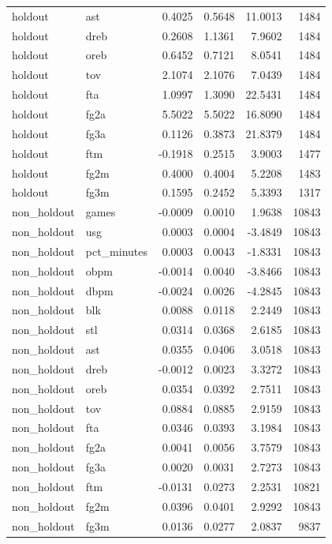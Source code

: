 \begin{table}
\begin{tabular}{llrrrr}
holdout & ast & 0.4025 & 0.5648 & 11.0013 & 1484 \\
holdout & dreb & 0.2608 & 1.1361 & 7.9602 & 1484 \\
holdout & oreb & 0.6452 & 0.7121 & 8.0541 & 1484 \\
holdout & tov & 2.1074 & 2.1076 & 7.0439 & 1484 \\
holdout & fta & 1.0997 & 1.3090 & 22.5431 & 1484 \\
holdout & fg2a & 5.5022 & 5.5022 & 16.8090 & 1484 \\
holdout & fg3a & 0.1126 & 0.3873 & 21.8379 & 1484 \\
holdout & ftm & -0.1918 & 0.2515 & 3.9003 & 1477 \\
holdout & fg2m & 0.4000 & 0.4004 & 5.2208 & 1483 \\
holdout & fg3m & 0.1595 & 0.2452 & 5.3393 & 1317 \\
non\_holdout & games & -0.0009 & 0.0010 & 1.9638 & 10843 \\
non\_holdout & usg & 0.0003 & 0.0004 & -3.4849 & 10843 \\
non\_holdout & pct\_minutes & 0.0003 & 0.0043 & -1.8331 & 10843 \\
non\_holdout & obpm & -0.0014 & 0.0040 & -3.8466 & 10843 \\
non\_holdout & dbpm & -0.0024 & 0.0026 & -4.2845 & 10843 \\
non\_holdout & blk & 0.0088 & 0.0118 & 2.2449 & 10843 \\
non\_holdout & stl & 0.0314 & 0.0368 & 2.6185 & 10843 \\
non\_holdout & ast & 0.0355 & 0.0406 & 3.0518 & 10843 \\
non\_holdout & dreb & -0.0012 & 0.0023 & 3.3272 & 10843 \\
non\_holdout & oreb & 0.0354 & 0.0392 & 2.7511 & 10843 \\
non\_holdout & tov & 0.0884 & 0.0885 & 2.9159 & 10843 \\
non\_holdout & fta & 0.0346 & 0.0393 & 3.1984 & 10843 \\
non\_holdout & fg2a & 0.0041 & 0.0056 & 3.7579 & 10843 \\
non\_holdout & fg3a & 0.0020 & 0.0031 & 2.7273 & 10843 \\
non\_holdout & ftm & -0.0131 & 0.0273 & 2.2531 & 10821 \\
non\_holdout & fg2m & 0.0396 & 0.0401 & 2.9292 & 10843 \\
non\_holdout & fg3m & 0.0136 & 0.0277 & 2.0837 & 9837 \\
\bottomrule
\end{tabular}
\end{table}
